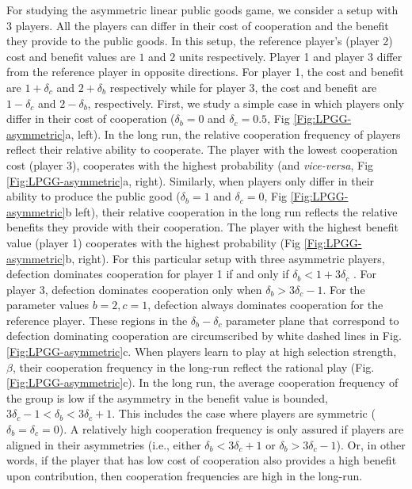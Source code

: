 \documentclass[11pt]{article}
\theoremstyle{plainCl1}
\theoremstyle{plainCl2}
\begin{document}
For studying the asymmetric linear public goods game, we consider a setup with 3 players. All the players can differ in their cost of cooperation and the benefit they provide to the public goods. In this setup, the reference player's (player 2) cost and benefit values are $1$ and $2$ units respectively. Player 1 and player 3 differ from the reference player in opposite directions. For player 1, the cost and benefit are $1 + \delta_c$ and $2 + \delta_b$ respectively while for player 3, the cost and benefit are $1 - \delta_c$ and $2 - \delta_b$, respectively. First, we study a simple case in which players only differ in their cost of cooperation ($\delta_b = 0$ and $\delta_c = 0.5$, Fig \ref{Fig:LPGG-asymmetric}a, left). In the long run, the relative cooperation frequency of players reflect their relative ability to cooperate. The player with the lowest cooperation cost (player 3), cooperates with the highest probability (and \emph{vice-versa},  Fig \ref{Fig:LPGG-asymmetric}a, right). Similarly, when players only differ in their ability to produce the public good ($\delta_b = 1$ and $\delta_c = 0$, Fig \ref{Fig:LPGG-asymmetric}b left), their relative cooperation in the long run reflects the relative benefits they provide with their cooperation. The player with the highest benefit value (player 1) cooperates with the highest probability (Fig \ref{Fig:LPGG-asymmetric}b, right). For this particular setup with three asymmetric players, defection dominates cooperation for player 1 if and only if $\delta_b < 1 + 3\delta_c$ . For player 3, defection dominates cooperation only when $\delta_b > 3\delta_c - 1$. For the parameter values $b = 2, c = 1$, defection always dominates cooperation for the reference player. These regions in the $\delta_b-\delta_c$ parameter plane that correspond to defection dominating cooperation are circumscribed by white dashed lines in Fig. \ref{Fig:LPGG-asymmetric}c. When players learn to play at high selection strength, $\beta$, their cooperation frequency in the long-run reflect the rational play (Fig. \ref{Fig:LPGG-asymmetric}c). In the long run, the average cooperation frequency of the group is low if the asymmetry in the benefit value is bounded, $3\delta_c - 1 < \delta_b < 3\delta_c + 1$. This includes the case where players are symmetric ($\delta_b = \delta_c = 0$). A relatively high cooperation frequency is only assured if players are aligned in their asymmetries (i.e., either $\delta_b < 3\delta_c +1$ or $\delta_b > 3\delta_c - 1$). Or, in other words, if the player that has low cost of cooperation also provides a high benefit upon contribution, then cooperation frequencies are high in the long-run. 
\end{document}
